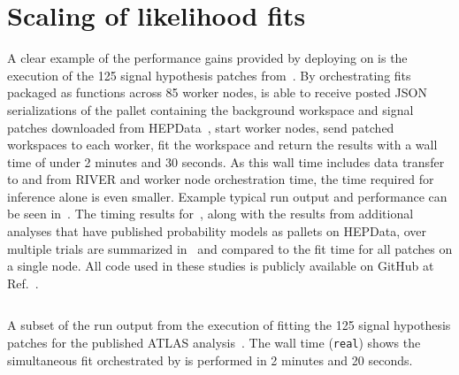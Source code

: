 \section{Scaling of likelihood fits}\label{sec:results}
%
A clear example of the performance gains provided by deploying \pyhf{} on \funcX{} is the execution of the 125 signal hypothesis patches from~\cite{SUSY-2019-08}.
By orchestrating \pyhf{} fits packaged as \funcX{} functions across 85 worker nodes, \funcX{} is able to receive posted JSON serializations of the \pyhf{} pallet containing the background workspace and signal patches downloaded from HEPData~\cite{ATLAS_SUSY_1Lbb_pallet}, start \funcX{} worker nodes, send patched workspaces to each worker, fit the workspace and return the results with a wall time of under 2 minutes and 30 seconds.
As this wall time includes data transfer to and from RIVER and worker node orchestration time, the time required for inference alone is even smaller.
Example typical run output and performance can be seen in~.
The timing results for~\cite{ATLAS_SUSY_1Lbb_pallet}, along with the results from additional analyses that have published probability models as \pyhf{} pallets on HEPData, over multiple trials are summarized in~ and compared to the fit time for all patches on a single node.
All code used in these studies is publicly available on GitHub at Ref.~\cite{study_code}.



\begin{listing}
 \inputminted{text}{src/code/funcX_demo_output.txt}
 \caption{A subset of the run output from the execution of fitting the 125 signal hypothesis patches for the published ATLAS analysis~\cite{SUSY-2019-08}.
 The wall time (\texttt{real}) shows the simultaneous fit orchestrated by \funcX{} is performed in 2 minutes and 20 seconds.}
 \label{lst:funcX_demo_output}
\end{listing}
